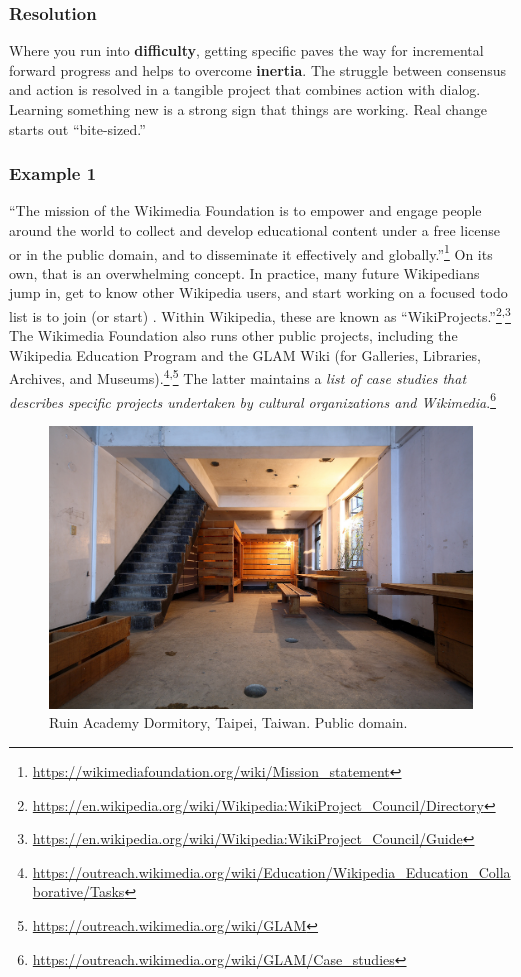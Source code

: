 \subsubsection*{Resolution}
Where you run into \textbf{difficulty}, getting specific paves the way for incremental forward progress and helps to overcome \textbf{inertia}.  The struggle between consensus and action is resolved in a tangible project that combines action with dialog.  Learning something new is a strong sign that things are working.
%
Real change starts out ``bite-sized.'' 

\subsubsection*{Example 1}
``The mission of the Wikimedia Foundation is to empower and engage people around the world to collect and develop educational content under a free license or in the public domain, and to disseminate it effectively and globally.''\footnote{\url{https://wikimediafoundation.org/wiki/Mission_statement}} On its own, that is an overwhelming concept.  In practice, many future Wikipedians jump in, get to know other Wikipedia users, and start working on a focused todo list is to join (or start)
.  Within Wikipedia, these are known
as
``WikiProjects.''\footnote{\url{https://en.wikipedia.org/wiki/Wikipedia:WikiProject_Council/Directory}}\textsuperscript{,}\footnote{\url{https://en.wikipedia.org/wiki/Wikipedia:WikiProject_Council/Guide}}
The Wikimedia Foundation also runs other public projects, including the Wikipedia Education Program and the GLAM Wiki (for Galleries, Libraries, Archives, and Museums).\footnote{\url{https://outreach.wikimedia.org/wiki/Education/Wikipedia_Education_Collaborative/Tasks}}\textsuperscript{,}\footnote{\url{https://outreach.wikimedia.org/wiki/GLAM}}  The latter maintains a \emph{list of case studies that describes specific projects undertaken by cultural organizations and Wikimedia}.\footnote{\url{https://outreach.wikimedia.org/wiki/GLAM/Case_studies}}

\begin{figure}
\vspace{-.5cm}
\begin{center}
\includegraphics[width=.45\textwidth]{Ruin_Academy_Dorm}
\end{center}
\vspace{-.5cm}
\caption{Ruin Academy Dormitory, Taipei, Taiwan. Public
  domain.\label{dormitory}}
\vspace{-.3cm}
\end{figure}

